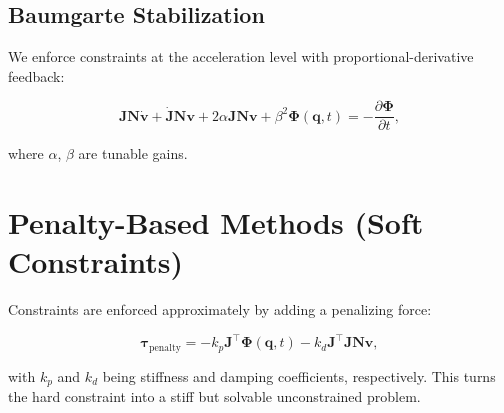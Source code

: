 \documentclass{article}
\begin{document}
\subsection{Baumgarte Stabilization}

We enforce constraints at the acceleration level with proportional-derivative
feedback:

\begin{equation}
    \bm{J} \bm{N} \dot{\bm{v}} + \dot{\bm{J}} \bm{N} \bm{v} + 2\alpha \bm{J} \bm{N} \bm{v} + \beta^2 \bm{\Phi}(\bm{q}, t) = -\frac{\partial \bm{\Phi}}{\partial t},
\end{equation}

where \( \alpha \), \( \beta \) are tunable gains.

\section{Penalty-Based Methods (Soft Constraints)}

Constraints are enforced approximately by adding a penalizing force:

\begin{equation}
    \bm{\tau}_{\text{penalty}} = -k_p \bm{J}^\top \bm{\Phi}(\bm{q}, t) - k_d \bm{J}^\top \bm{J} \bm{N} \bm{v},
\end{equation}

with \( k_p \) and \( k_d \) being stiffness and damping coefficients,
respectively. This turns the hard constraint into a stiff but solvable
unconstrained problem.
\end{document}
